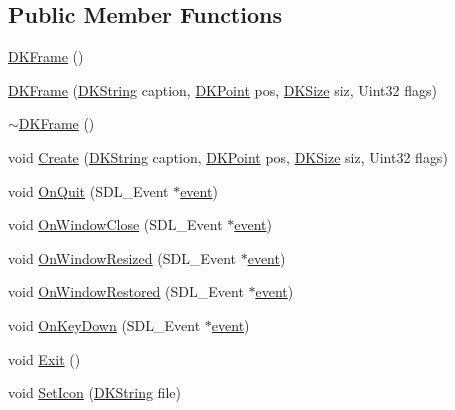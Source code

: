 \subsection*{Public Member Functions}
\begin{DoxyCompactItemize}
\item 
\hyperlink{class_d_k_frame_ae5c689ee5478cb6c8f5b29c5e96f6fd5}{D\-K\-Frame} ()
\item 
\hyperlink{class_d_k_frame_af3a75e119329fdf408d21202415ca2e5}{D\-K\-Frame} (\hyperlink{_d_k_string_8h_ac168e8555ceba18e1a2919b21976bc84}{D\-K\-String} caption, \hyperlink{_d_k_axis_8h_a0ca1f005fbb936f8e7a7f2433591f418}{D\-K\-Point} pos, \hyperlink{_d_k_axis_8h_aaa25a8c7cbf504fffdb8a4208ff7a731}{D\-K\-Size} siz, Uint32 flags)
\item 
\hyperlink{class_d_k_frame_aa7c845d8b503648ca3a6194c2b6b0842}{$\sim$\-D\-K\-Frame} ()
\item 
void \hyperlink{class_d_k_frame_a5ebab2f2bd261d2c9ff9617277e55a14}{Create} (\hyperlink{_d_k_string_8h_ac168e8555ceba18e1a2919b21976bc84}{D\-K\-String} caption, \hyperlink{_d_k_axis_8h_a0ca1f005fbb936f8e7a7f2433591f418}{D\-K\-Point} pos, \hyperlink{_d_k_axis_8h_aaa25a8c7cbf504fffdb8a4208ff7a731}{D\-K\-Size} siz, Uint32 flags)
\item 
void \hyperlink{class_d_k_frame_a23e956503b58a86b88249746a4a42c15}{On\-Quit} (S\-D\-L\-\_\-\-Event $\ast$\hyperlink{class_d_k_event_a3deebb932ed734363c4ece87971bc45f}{event})
\item 
void \hyperlink{class_d_k_frame_a04fa81f7776764c3e5881f4407e1b15f}{On\-Window\-Close} (S\-D\-L\-\_\-\-Event $\ast$\hyperlink{class_d_k_event_a3deebb932ed734363c4ece87971bc45f}{event})
\item 
void \hyperlink{class_d_k_frame_a207c54d535a3d41f799b51b4d127b9d8}{On\-Window\-Resized} (S\-D\-L\-\_\-\-Event $\ast$\hyperlink{class_d_k_event_a3deebb932ed734363c4ece87971bc45f}{event})
\item 
void \hyperlink{class_d_k_frame_af1ea13945751b5b5637800099f741c0d}{On\-Window\-Restored} (S\-D\-L\-\_\-\-Event $\ast$\hyperlink{class_d_k_event_a3deebb932ed734363c4ece87971bc45f}{event})
\item 
void \hyperlink{class_d_k_frame_ae8f5c2d39359027fd2e684f2cd1516d0}{On\-Key\-Down} (S\-D\-L\-\_\-\-Event $\ast$\hyperlink{class_d_k_event_a3deebb932ed734363c4ece87971bc45f}{event})
\item 
void \hyperlink{class_d_k_frame_a4e757c5fcc36d97348a5bd9227fe8431}{Exit} ()
\item 
void \hyperlink{class_d_k_frame_a914b54c73a2fcdbdcbc4ecfb805e3333}{Set\-Icon} (\hyperlink{_d_k_string_8h_ac168e8555ceba18e1a2919b21976bc84}{D\-K\-String} file)

\end{DoxyCompactItemize}
